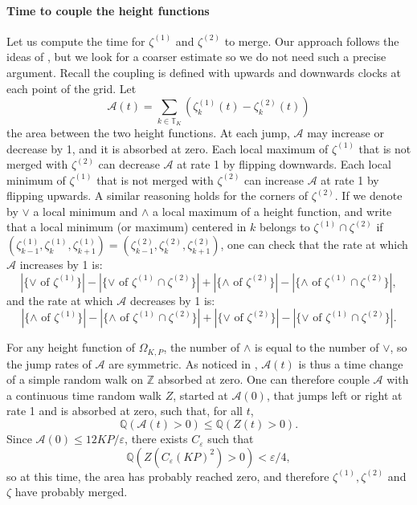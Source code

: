 \documentclass[11pt,a4paper]{article}
\newcommand{\Z}{\mathbb{Z}}
\newcommand{\T}{\mathbb{T}}
\newcommand{\Q}{\mathbb{Q}}
\newcommand{\eqs}[1]{\begin{equation}#1\end{equation}}
\begin{document}
\paragraph{Time to couple the height functions}
Let us compute the time for $\zeta^{(1)}$ and $\zeta^{(2)}$ to merge. 
Our approach follows the ideas of \cite{lacoin_simple_2017}, but we look for a coarser estimate so we do not need such a precise argument. Recall the coupling is defined with upwards and downwards clocks at each point of the grid.
Let 
\eqs{\mathcal{A}(t) = \sum_{k\in \T_K} \left(\zeta^{(1)}_k(t) - \zeta^{(2)}_k(t)\right)} the area between the two height functions. At each jump, $\mathcal{A}$ may increase or decrease by 1, and it is absorbed at zero. 
Each local maximum of $\zeta^{(1)}$ that is not merged with $\zeta^{(2)}$ can decrease $\mathcal{A}$ at rate 1 by flipping downwards. Each local minimum of $\zeta^{(1)}$ that is not merged with $\zeta^{(2)}$ can increase $\mathcal{A}$ at rate 1 by flipping upwards. A similar reasoning holds for the corners of $\zeta^{(2)}$. 
If we denote by $\vee$ a local minimum and $\wedge$ a local maximum of a height function, and write that a local minimum (or maximum) centered in $k$ belongs to $\zeta^{(1)}\cap \zeta^{(2)}$ if $(\zeta^{(1)}_{k-1},\zeta^{(1)}_k,\zeta^{(1)}_{k+1}) = (\zeta^{(2)}_{k-1},\zeta^{(2)}_{k},\zeta^{(2)}_{k+1}) $,
one can check that the rate at which $\mathcal{A}$ increases by 1 is:
\eqs{|\{\vee \text{ of } \zeta^{(1)}\}| - |\{\vee \text{ of } \zeta^{(1)}\cap\zeta^{(2)}\}|+ |\{\wedge \text{ of } \zeta^{(2)}\}|  - |\{\wedge \text{ of } \zeta^{(1)}\cap\zeta^{(2)}\}|,}
and the rate at which $\mathcal{A}$ decreases by 1 is:
\eqs{|\{\wedge \text{ of } \zeta^{(1)}\}| - |\{\wedge \text{ of } \zeta^{(1)}\cap\zeta^{(2)}\}|+ |\{\vee \text{ of } \zeta^{(2)}\}|  - |\{\vee \text{ of } \zeta^{(1)}\cap\zeta^{(2)}\}|.}

For any height function of $\Omega_{K,P}$, the number of $\wedge$ is equal to the number of $\vee$, so the jump rates of $\mathcal{A}$ are symmetric. As noticed in \cite[Section 6]{lacoin_simple_2017}, $\mathcal{A}(t)$ is thus a time change of a simple random walk on $\Z$ absorbed at zero. One can therefore couple $\mathcal{A}$ with a continuous time random walk $Z$, started at $\mathcal{A}(0)$, that jumps left or right at rate 1 and is absorbed at zero, such that, for all $t$, 
\eqs{\Q\left(\mathcal{A}(t) > 0\right) \le \Q\left(Z(t) > 0\right).} 
Since $\mathcal{A}(0) \le 12 KP /\varepsilon$, there exists $C_\varepsilon$ such that 
\eqs{\Q\left(Z\left(C_\varepsilon (KP)^2\right)> 0\right) <\varepsilon/4,}
so at this time, the area has probably reached zero, and therefore $\zeta^{(1)},\zeta^{(2)}$ and $\zeta$ have probably merged.  
\end{document}
